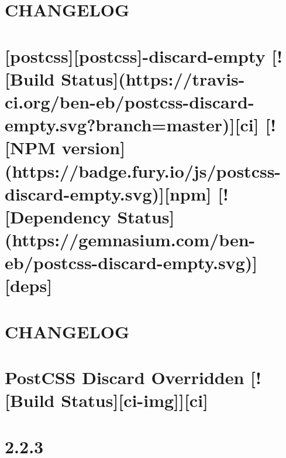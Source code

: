 \documentclass[twoside]{book}
\newcommand{\+}{\discretionary{\mbox{\scriptsize$\hookleftarrow$}}{}{}}
\begin{document}
\chapter{C\+H\+A\+N\+G\+E\+L\+OG}
\label{md__c_1_workspace_demo_src_main_script_node_modules_postcss-discard-empty__c_h_a_n_g_e_l_o_g}

\chapter{\mbox{[}postcss\mbox{]}\mbox{[}postcss\mbox{]}-\/discard-\/empty \mbox{[}!\mbox{[}Build Status\mbox{]}(https\+://travis-\/ci.org/ben-\/eb/postcss-\/discard-\/empty.svg?branch=master)\mbox{]}\mbox{[}ci\mbox{]} \mbox{[}!\mbox{[}N\+PM version\mbox{]}(https\+://badge.fury.\+io/js/postcss-\/discard-\/empty.svg)\mbox{]}\mbox{[}npm\mbox{]} \mbox{[}!\mbox{[}Dependency Status\mbox{]}(https\+://gemnasium.com/ben-\/eb/postcss-\/discard-\/empty.svg)\mbox{]}\mbox{[}deps\mbox{]}}
\label{md__c_1_workspace_demo_src_main_script_node_modules_postcss-discard-empty__r_e_a_d_m_e}

\chapter{C\+H\+A\+N\+G\+E\+L\+OG}
\label{md__c_1_workspace_demo_src_main_script_node_modules_postcss-discard-overridden__c_h_a_n_g_e_l_o_g}

\chapter{Post\+C\+SS Discard Overridden \mbox{[}!\mbox{[}Build Status\mbox{]}\mbox{[}ci-\/img\mbox{]}\mbox{]}\mbox{[}ci\mbox{]}}
\label{md__c_1_workspace_demo_src_main_script_node_modules_postcss-discard-overridden__r_e_a_d_m_e}

\chapter{2.2.3}
\label{md__c_1_workspace_demo_src_main_script_node_modules_postcss-discard-unused__c_h_a_n_g_e_l_o_g}

\end{document}
